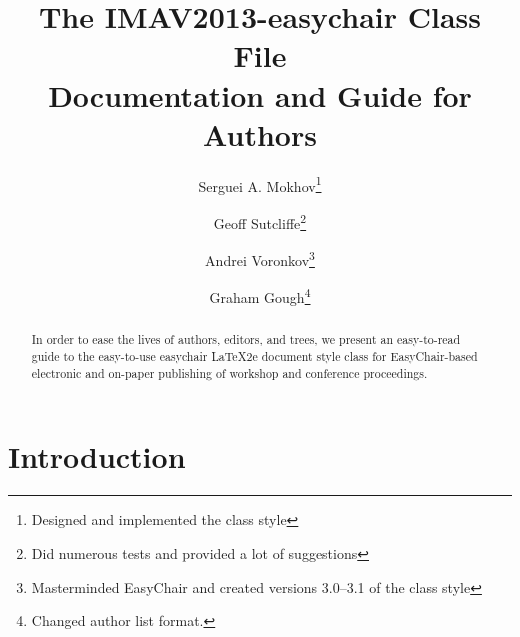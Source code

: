 \documentclass{imav2013}
\newcommand{\imav}{\textsf{IMAV2013}}
\newcommand{\easychair}{\textsf{easychair}}
\begin{document}
%
\title{The {\imav}-{\easychair} Class File\\
       Documentation and Guide for Authors}

%
\author{
Serguei A. Mokhov\thanks{Designed and implemented the class style}
\and
    Geoff Sutcliffe\thanks{Did numerous tests and provided a lot of suggestions}
\and
   Andrei Voronkov\thanks{Masterminded EasyChair and created versions
     3.0--3.1 of the class style}\\
\and
   Graham Gough\thanks{Changed author list format.}\\
}

 
\clearpage

\maketitle

\begin{abstract}
  In order to ease the lives of authors, editors, and trees, we present an
  easy-to-read guide to the easy-to-use {\easychair} {\LaTeX2e} document style
  class for EasyChair-based electronic and on-paper publishing of workshop and conference
  proceedings.
\end{abstract}



\section{Introduction}
\label{sect:introduction}
\end{document}
